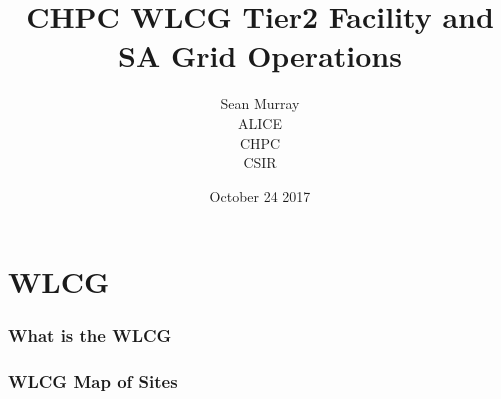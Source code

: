 \documentclass{beamer}
\title{CHPC WLCG Tier2 Facility and SA Grid Operations}
\author{Sean Murray \\
    ALICE \\
    CHPC \\
    CSIR 
}
\date{October 24 2017}
\begin{document}
\begin{frame}
\titlepage
\end{frame}

\section{WLCG}

\begin{frame}
\frametitle{What is the WLCG}
\end{frame}
\begin{frame}
\frametitle{WLCG Map of Sites}
\end{frame}
\end{document}
